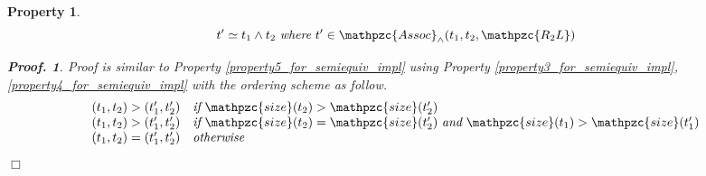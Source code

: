 \documentclass[12pt]{article}
\newtheorem{Property}{Property}[section]
\newtheorem{Proof}{Proof.}
\begin{document}
\begin{Property}
  \label{property6_for_semiequiv_impl}
  \[ t' \simeq t_1 \wedge t_2\ \text{\it where}\
      t' \in \mathpzc{Assoc}_\wedge(t_1, t_2, \mathpzc{R_2L})
  \]
  \begin{Proof}
    Proof is similar to Property \ref{property5_for_semiequiv_impl}
    using Property \ref{property3_for_semiequiv_impl},
    \ref{property4_for_semiequiv_impl} with
    the ordering scheme as follow.
    \[ \begin{array}{l}
         (t_1, t_2) > (t'_1, t'_2) \quad
          \text{\it if}\ \mathpzc{size}(t_2) > \mathpzc{size}(t'_2)  \\
         (t_1, t_2) > (t'_1, t'_2) \quad
          \text{\it if}\ \mathpzc{size}(t_2) = \mathpzc{size}(t'_2)\
           \text{\it and}\ \mathpzc{size}(t_1) > \mathpzc{size}(t'_1)  \\
         (t_1, t_2) = (t'_1, t'_2) \quad \text{\it otherwise}
    \end{array}
    \]
    $\Box$
  \end{Proof}
\end{Property}
\end{document}

